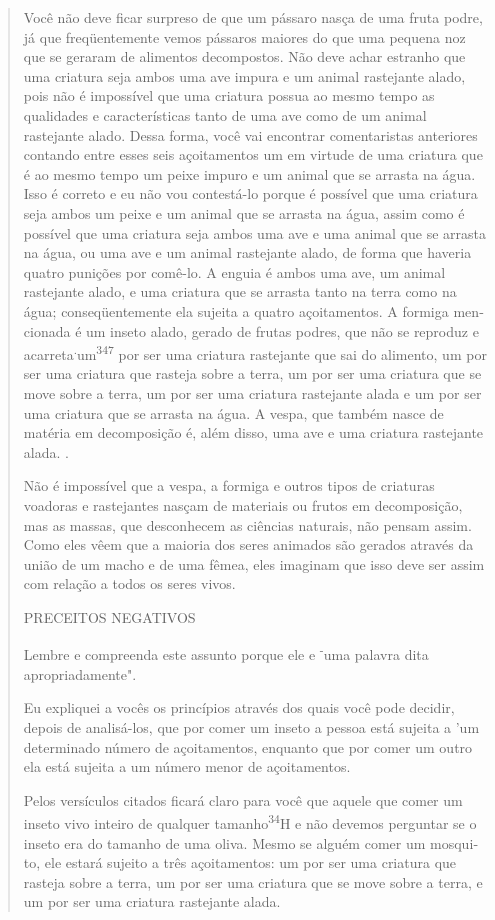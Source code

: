 \begin{quote}
Você não deve ficar surpreso de que um pássaro nasça de uma fruta podre,
já que freqüentemente vemos pássaros maiores do que uma pequena noz que
se geraram de alimentos decompostos. Não deve achar estranho que uma
criatura seja ambos uma ave impura e um animal rastejante alado, pois
não é impossível que uma criatura possua ao mesmo tempo as qualidades e
caracte­rísticas tanto de uma ave como de um animal rastejante alado.
Dessa forma, você vai encontrar comentaristas anteriores contando entre
esses seis açoita­mentos um em virtude de uma criatura que é ao mesmo
tempo um peixe impu­ro e um animal que se arrasta na água. Isso é
correto e eu não vou contestá-lo porque é possível que uma criatura seja
ambos um peixe e um animal que se arrasta na água, assim como é possível
que uma criatura seja ambos uma ave e uma animal que se arrasta na água,
ou uma ave e um animal rastejante alado, de forma que haveria quatro
punições por comê-lo. A enguia é ambos uma ave, um animal rastejante
alado, e uma criatura que se arrasta tanto na terra como na água;
conseqüentemente ela sujeita a quatro açoitamentos. A formiga
men­cionada é um inseto alado, gerado de frutas podres, que não se
reproduz e acar­reta\textsuperscript{.}um\textsuperscript{347} por ser
uma criatura rastejante que sai do alimento, um por ser uma criatura que
rasteja sobre a terra, um por ser uma criatura que se move sobre a
terra, um por ser uma criatura rastejante alada e um por ser uma
criatura que se arrasta na água. A vespa, que também nasce de matéria em
decomposição é, além disso, uma ave e uma criatura rastejante alada. .

Não é impossível que a vespa, a formiga e outros tipos de criaturas
voadoras e rastejantes nasçam de materiais ou frutos em decomposição,
mas as massas, que desconhecem as ciências naturais, não pensam assim.
Como eles vêem que a maioria dos seres animados são gerados através da
união de um macho e de uma fêmea, eles imaginam que isso deve ser assim
com relação a todos os seres vivos.

PRECEITOS NEGATIVOS

Lembre e compreenda este assunto porque ele e \textsuperscript{-}uma
palavra dita apropriadamente".

Eu expliquei a vocês os princípios através dos quais você pode deci­dir,
depois de analisá-los, que por comer um inseto a pessoa está sujeita a
'um determinado número de açoitamentos, enquanto que por comer um outro
ela está sujeita a um número menor de açoitamentos.

Pelos versículos citados ficará claro para você que aquele que co­mer um
inseto vivo inteiro de qualquer tamanho\textsuperscript{34}H e não
devemos perguntar se o inseto era do tamanho de uma oliva. Mesmo se
alguém comer um mosqui­to, ele estará sujeito a três açoitamentos: um
por ser uma criatura que rasteja sobre a terra, um por ser uma criatura
que se move sobre a terra, e um por ser uma criatura rastejante alada.


\end{quote}
